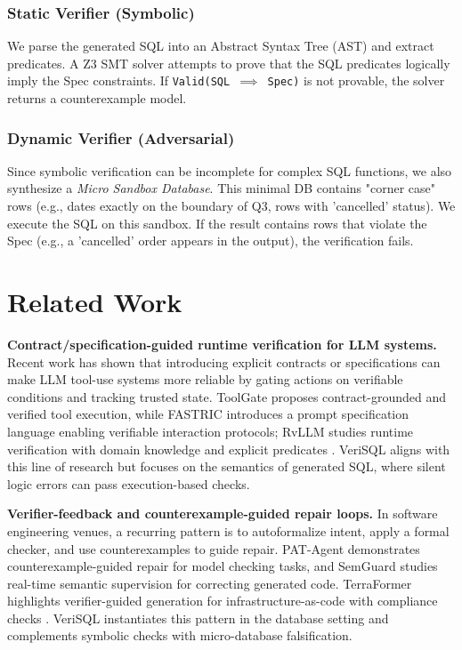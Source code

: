 \documentclass[sigconf,review,anonymous]{acmart}
\begin{document}
\subsubsection{Static Verifier (Symbolic)}
We parse the generated SQL into an Abstract Syntax Tree (AST) and extract predicates. A Z3 SMT solver attempts to prove that the SQL predicates logically imply the Spec constraints. If \texttt{Valid(SQL $\implies$ Spec)} is not provable, the solver returns a counterexample model.

\subsubsection{Dynamic Verifier (Adversarial)}
Since symbolic verification can be incomplete for complex SQL functions, we also synthesize a \textit{Micro Sandbox Database}. This minimal DB contains "corner case" rows (e.g., dates exactly on the boundary of Q3, rows with 'cancelled' status). We execute the SQL on this sandbox. If the result contains rows that violate the Spec (e.g., a 'cancelled' order appears in the output), the verification fails.

\section{Related Work}

\textbf{Contract/specification-guided runtime verification for LLM systems.} Recent work has shown that introducing explicit contracts or specifications can make LLM tool-use systems more reliable by gating actions on verifiable conditions and tracking trusted state. ToolGate proposes contract-grounded and verified tool execution, while FASTRIC introduces a prompt specification language enabling verifiable interaction protocols; RvLLM studies runtime verification with domain knowledge and explicit predicates \cite{toolgate2026,fastric2025,rvllm2025}. VeriSQL aligns with this line of research but focuses on the semantics of generated SQL, where silent logic errors can pass execution-based checks.

\textbf{Verifier-feedback and counterexample-guided repair loops.} In software engineering venues, a recurring pattern is to autoformalize intent, apply a formal checker, and use counterexamples to guide repair. PAT-Agent demonstrates counterexample-guided repair for model checking tasks, and SemGuard studies real-time semantic supervision for correcting generated code. TerraFormer highlights verifier-guided generation for infrastructure-as-code with compliance checks \cite{patagent2025,semguard2025,terraformer2026}. VeriSQL instantiates this pattern in the database setting and complements symbolic checks with micro-database falsification.
\end{document}
